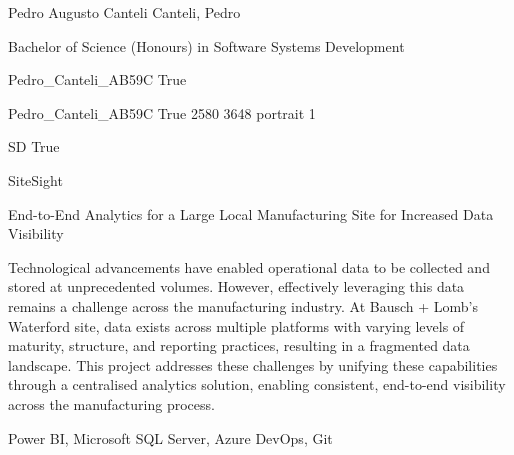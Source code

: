 \documentclass[twoside]{report}
\begin{document}
\begingroup{}\relax



\def\Key{Pedro_Canteli_AB59C}

{Pedro Augusto Canteli}
{Canteli, Pedro}

{Bachelor of Science (Honours) in Software Systems Development}

{Pedro_Canteli_AB59C}
{True}

{Pedro_Canteli_AB59C}
{True}
{2580}
{3648}
{portrait}
{1}

{SD}
{True}

{SiteSight}

{End-to-End Analytics for a Large Local Manufacturing Site for Increased Data Visibility}

{Technological advancements have enabled operational data to be collected and stored at unprecedented volumes. However, effectively leveraging this data remains a challenge across the manufacturing industry. At Bausch + Lomb's Waterford site, data exists across multiple platforms with varying levels of maturity, structure, and reporting practices, resulting in a fragmented data landscape. This project addresses these challenges by unifying these capabilities through a centralised analytics solution, enabling consistent, end-to-end visibility across the manufacturing process.}

{Power BI, Microsoft SQL Server, Azure DevOps, Git}
\end{document}

